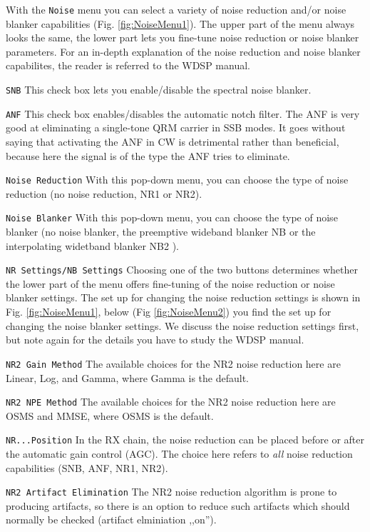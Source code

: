 \documentclass[12pt]{book}
\def\rett#1{\texttt{\color{red}#1}}
\def\bltt#1{\texttt{\color{blue}#1}}
\begin{document}
With the \bltt{Noise} menu you can select a variety of noise reduction and/or
noise blanker capabilities (Fig. \ref{fig:NoiseMenu1}). The upper part of the
menu always looks the same, the lower part lets you fine-tune noise reduction
or noise blanker parameters. For an in-depth explanation of the noise reduction
and noise blanker capabilites, the reader is referred to the WDSP manual.

\rett{SNB} This check box lets you enable/disable the spectral noise blanker.

\rett{ANF} This check box enables/disables the automatic notch filter. The ANF is
very good at eliminating a single-tone QRM carrier in SSB modes. It goes without
saying that activating the ANF in CW is detrimental rather than beneficial, because
here the signal is of the type the ANF tries to eliminate.

\rett{Noise Reduction} With this pop-down menu, you can choose the type of noise reduction
(no noise reduction, NR1 or NR2).

\rett{Noise Blanker} With this pop-down menu, you can choose the type of noise blanker
(no noise blanker, the preemptive wideband blanker NB or the interpolating widetband
blanker NB2 ).

\rett{NR Settings/NB Settings} Choosing one of the two buttons determines whether the
lower part of the menu offers fine-tuning of the noise reduction or noise blanker settings.
The set up for changing the noise reduction settings is shown in Fig. \ref{fig:NoiseMenu1},
below (Fig \ref{fig:NoiseMenu2}) you find the set up for changing the noise blanker settings.
We discuss the noise reduction settings first, but note again for the details you have
to study the WDSP manual.

\rett{NR2 Gain Method} The available choices for the NR2 noise reduction here are Linear, Log, and Gamma, where Gamma is the default.

\rett{NR2 NPE Method} The available choices for the NR2 noise reduction here are OSMS and MMSE,
where OSMS is the default.

\rett{NR...Position} In the RX chain, the noise reduction can be placed before or after
the automatic gain control (AGC). The choice here refers to \textit{all} noise reduction
capabilities (SNB, ANF, NR1, NR2).

\rett{NR2 Artifact Elimination} The NR2 noise reduction algorithm is prone to producing
artifacts, so there is an option to reduce such artifacts which should normally be checked
(artifact elminiation ,,on'').
\end{document}
